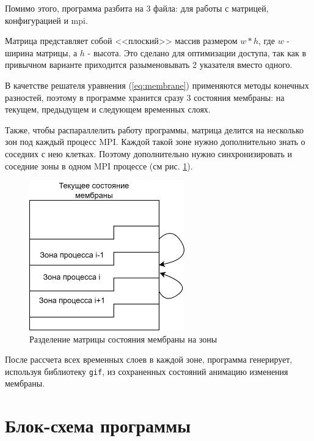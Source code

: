 Помимо этого, программа разбита на 3 файла: для работы с матрицей, конфигурацией
и mpi.

Матрица представляет собой <<плоский>> массив размером $w * h$, где $w$ - ширина
матрицы, а $h$ - высота. Это сделано для оптимизации доступа, так как в
привычном варианте приходится разыменовывать 2 указателя вместо одного.

В качетстве решателя уравнения (\ref{eq:membrane}) применяются методы конечных
разностей, поэтому в программе хранится сразу 3 состояния мембраны: на текущем,
предыдущем и следующем временных слоях. 

Также, чтобы распараллелить работу
программы, матрица делится на несколько зон под каждый процесс MPI. Каждой такой
зоне нужно дополнительно знать о соседних с нею клетках. Поэтому дополнительно
нужно синхронизировать и соседние зоны в одном MPI процессе (см рис.
\ref{fig:processes}).

\begin{figure}[H]
    \centering
    \includegraphics[width=0.6\textwidth]{images/lab4_processes.drawio.png}
    \caption{Разделение матрицы состояния мембраны на зоны}
    \label{fig:processes}
\end{figure}

После рассчета всех временных слоев в каждой зоне, программа генерирует,
используя библиотеку \texttt{gif}, из сохраненных состояний анимацию изменения мембраны.

\newpage

\section*{Блок-схема программы}


